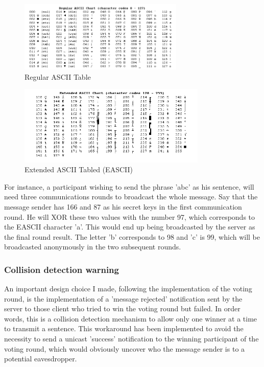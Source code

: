 \begin{figure}[H]
    \centering
    \includegraphics[width=0.7\textwidth]{Images/Design/ascii.png}
    \caption{Regular ASCII Table \cite{Ascii}}
    \label{fig:ascii}
\end{figure}

\begin{figure}[H]
    \centering
    \includegraphics[width=0.8\textwidth]{Images/Design/eascii.png}
    \caption{Extended ASCII Tabled (EASCII) \cite{Ascii}}
    \label{fig:eascii}
\end{figure}


For instance, a participant wishing to send the phrase 'abc' as his sentence, will need three communications rounds to broadcast the whole message. Say that the message sender has 166 and 87 as his secret keys in the first communication round. He will XOR these two values with the number 97, which corresponds to the EASCII character 'a'. This would end up being broadcasted by the server as the final round result. The letter 'b' corresponds to 98 and 'c' is 99, which will be broadcasted anonymously in the two subsequent rounds.


\subsubsection{Collision detection warning} \label{sec:collisionDetectionWarnings}
An important design choice I made, following the implementation of the voting round, is the implementation of a 'message rejected' notification sent by the server to those client who tried to win the voting round but failed. In order words, this is a collision detection mechanism to allow only one winner at a time to transmit a sentence. This workaround has been implemented to avoid the necessity to send a unicast 'success' notification to the winning participant of the voting round, which would obviously uncover who the message sender is to a potential eavesdropper.

